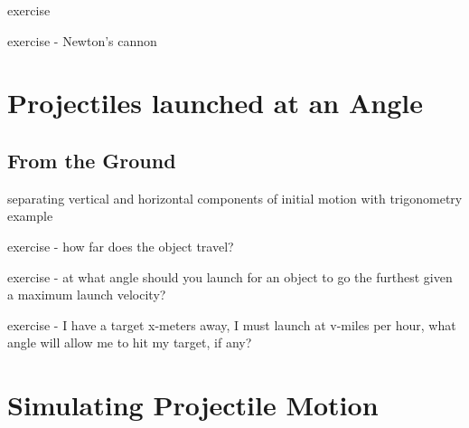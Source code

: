 exercise

exercise - Newton's cannon

\section{Projectiles launched at an Angle}
\subsection{From the Ground}
separating vertical and horizontal components of initial motion with trigonometry
example

exercise - how far does the object travel?

exercise - at what angle should you launch for an object to go the furthest given a maximum launch velocity?

exercise - I have a target x-meters away, I must launch at v-miles per hour, what angle will allow me to hit my target, if any?

\section{Simulating Projectile Motion}
